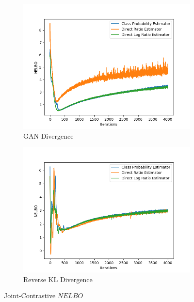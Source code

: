 \documentclass[honours,12pt]{unswthesis}
\numberwithin{equation}{section}
\theoremstyle{definition}
\begin{document}
\begin{figure}
\begin{subfigure}{0.49\textwidth}
\includegraphics[width=\linewidth]{part2nelbos/JCADVvsJCADVexpvsJCADVgudlog.png}
\caption{GAN Divergence}
\end{subfigure}
\begin{subfigure}{0.49\textwidth}
\includegraphics[width=\linewidth]{part2nelbos/JCKLDvsJCKLexpvsJCKLgudlog.png}
\caption{Reverse KL Divergence}
\end{subfigure}
\caption{Joint-Contrastive $NELBO$}
\end{figure}
\newpage
\end{document}
